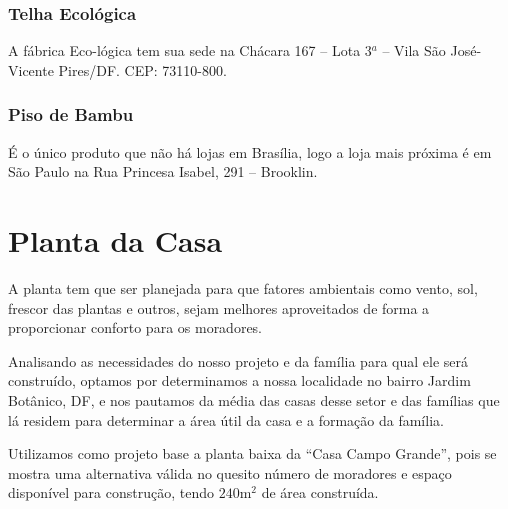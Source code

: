 \subsubsection*{\textbf{Telha Ecológica}}

	A fábrica Eco-lógica tem sua sede na Chácara 167 – Lota 3$^a$ – Vila São José- Vicente Pires/DF. CEP: 73110-800.

\subsubsection*{\textbf{Piso de Bambu}}

	É o único produto que não há lojas em Brasília, logo a loja mais próxima é em São Paulo na Rua Princesa Isabel, 291 – Brooklin.


\section{Planta da Casa}

	A planta tem que ser planejada para que fatores ambientais como vento, sol, frescor das plantas e outros, sejam melhores aproveitados de forma a proporcionar conforto para os moradores.

	Analisando as necessidades do nosso projeto e da família para qual ele será construído, optamos por determinamos a nossa localidade no bairro Jardim Botânico, DF, e nos pautamos da média das casas desse setor e das famílias que lá residem para determinar a área útil da casa e a formação da família.

	Utilizamos como projeto base a planta baixa da “Casa Campo Grande”, pois se mostra uma alternativa válida no quesito número de moradores e espaço disponível para construção, tendo $240\si{\meter}^{2}$ de área construída.

